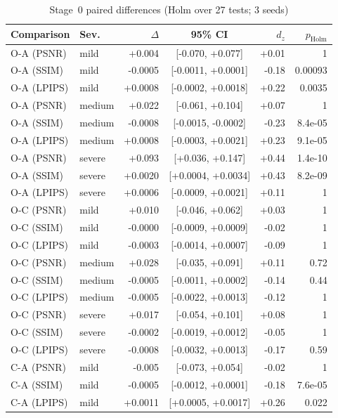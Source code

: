\begin{table}[t]
\centering
\caption{Stage~0 paired differences (Holm over 27 tests; 3 seeds)}
\label{tab:gating_stats}
\scriptsize
\setlength{\tabcolsep}{3pt}
\begin{tabular}{llrcrr}
\toprule
Comparison & Sev. & $\Delta$ & 95\% CI & $d_z$ & $p_\mathrm{Holm}$ \\
\midrule
O-A (PSNR) & mild & +0.004 & [-0.070, +0.077] & +0.01 & 1 \\
O-A (SSIM) & mild & -0.0005 & [-0.0011, +0.0001] & -0.18 & 0.00093 \\
O-A (LPIPS) & mild & +0.0008 & [-0.0002, +0.0018] & +0.22 & 0.0035 \\
O-A (PSNR) & medium & +0.022 & [-0.061, +0.104] & +0.07 & 1 \\
O-A (SSIM) & medium & -0.0008 & [-0.0015, -0.0002] & -0.23 & 8.4e-05 \\
O-A (LPIPS) & medium & +0.0008 & [-0.0003, +0.0021] & +0.23 & 9.1e-05 \\
O-A (PSNR) & severe & +0.093 & [+0.036, +0.147] & +0.44 & 1.4e-10 \\
O-A (SSIM) & severe & +0.0020 & [+0.0004, +0.0034] & +0.43 & 8.2e-09 \\
O-A (LPIPS) & severe & +0.0006 & [-0.0009, +0.0021] & +0.11 & 1 \\
O-C (PSNR) & mild & +0.010 & [-0.046, +0.062] & +0.03 & 1 \\
O-C (SSIM) & mild & -0.0000 & [-0.0009, +0.0009] & -0.02 & 1 \\
O-C (LPIPS) & mild & -0.0003 & [-0.0014, +0.0007] & -0.09 & 1 \\
O-C (PSNR) & medium & +0.028 & [-0.035, +0.091] & +0.11 & 0.72 \\
O-C (SSIM) & medium & -0.0005 & [-0.0011, +0.0002] & -0.14 & 0.44 \\
O-C (LPIPS) & medium & -0.0005 & [-0.0022, +0.0013] & -0.12 & 1 \\
O-C (PSNR) & severe & +0.017 & [-0.054, +0.101] & +0.08 & 1 \\
O-C (SSIM) & severe & -0.0002 & [-0.0019, +0.0012] & -0.05 & 1 \\
O-C (LPIPS) & severe & -0.0008 & [-0.0032, +0.0013] & -0.17 & 0.59 \\
C-A (PSNR) & mild & -0.005 & [-0.073, +0.054] & -0.02 & 1 \\
C-A (SSIM) & mild & -0.0005 & [-0.0012, +0.0001] & -0.18 & 7.6e-05 \\
C-A (LPIPS) & mild & +0.0011 & [+0.0005, +0.0017] & +0.26 & 0.022 \\

\end{tabular}
\end{table}
